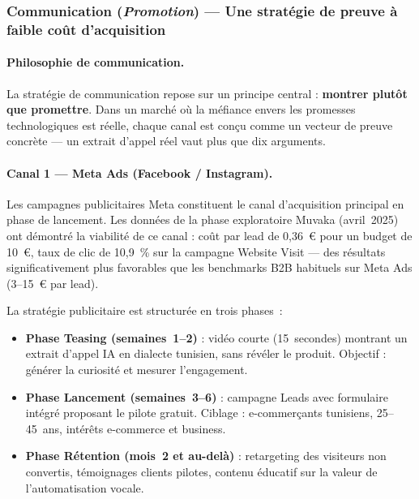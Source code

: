 \subsubsection{Communication (\textit{Promotion}) --- Une stratégie de preuve
à faible coût d'acquisition}

\paragraph{Philosophie de communication.}
La stratégie de communication repose sur un principe central :
\textbf{montrer plutôt que promettre}. Dans un marché où la méfiance envers les
promesses technologiques est réelle, chaque canal est conçu comme un vecteur
de preuve concrète --- un extrait d'appel réel vaut plus que dix arguments.

\paragraph{Canal 1 --- Meta Ads (Facebook / Instagram).}
Les campagnes publicitaires Meta constituent le canal d'acquisition principal
en phase de lancement. Les données de la phase exploratoire Muvaka (avril~2025)
ont démontré la viabilité de ce canal : coût par lead de 0,36~\euro{} pour un budget
de 10~\euro{}, taux de clic de 10,9~\% sur la campagne Website Visit --- des résultats
significativement plus favorables que les benchmarks B2B habituels sur
Meta Ads (3--15~\euro{} par lead).

La stratégie publicitaire est structurée en trois phases~:
\begin{itemize}
    \item \textbf{Phase Teasing (semaines~1--2)} : vidéo courte (15~secondes)
    montrant un extrait d'appel IA en dialecte tunisien, sans révéler le produit.
    Objectif : générer la curiosité et mesurer l'engagement.
    \item \textbf{Phase Lancement (semaines~3--6)} : campagne Leads avec
    formulaire intégré proposant le pilote gratuit. Ciblage : e-commerçants
    tunisiens, 25--45~ans, intérêts e-commerce et business.
    \item \textbf{Phase Rétention (mois~2 et au-delà)} : retargeting des
    visiteurs non convertis, témoignages clients pilotes, contenu éducatif sur
    la valeur de l'automatisation vocale.
\end{itemize}


